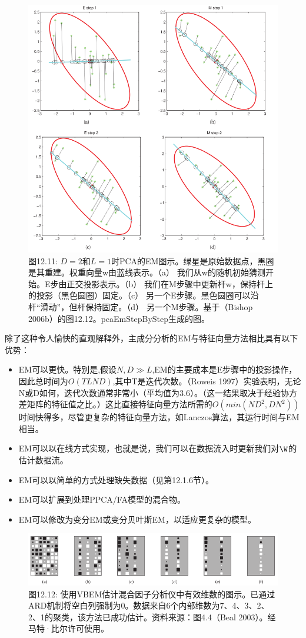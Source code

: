 \documentclass[a4paper]{article}
\begin{document}
\begin{figure}[h]
	\centering
	\includegraphics[width=0.7\linewidth]{fig/figure11}
	\caption*{图12.11: $D=2$和$L=1$时PCA的EM图示。绿星是原始数据点，黑圈是其重建。权重向量w由蓝线表示。（a） 我们从w的随机初始猜测开始。E步由正交投影表示。（b） 我们在M步骤中更新杆w，保持杆上的投影（黑色圆圈）固定。（c） 另一个E步骤。黑色圆圈可以沿杆“滑动”，但杆保持固定。（d） 另一个M步骤。基于（Bishop 2006b）的图12.12。pcaEmStepByStep生成的图。 }
\end{figure}

除了这种令人愉快的直观解释外，主成分分析的EM与特征向量方法相比具有以下优势： 
\begin{itemize}
\item  EM可以更快。特别是,假设$N,D \gg L$,EM的主要成本是E步骤中的投影操作，因此总时间为$O(TLND)$,其中T是迭代次数。（Roweis 1997）实验表明，无论N或D如何，迭代次数通常非常小（平均值为3.6）。（这一结果取决于经验协方差矩阵的特征值之比。）这比直接特征向量方法所需的$O(min(ND^2,DN^2))$时间快得多，尽管更复杂的特征向量方法，如Lanczos算法，其运行时间与EM相当。
\item EM可以以在线方式实现，也就是说，我们可以在数据流入时更新我们对$\W$的估计数据流。 
\item EM可以以简单的方式处理缺失数据（见第12.1.6节）。 
\item EM可以扩展到处理PPCA/FA模型的混合物。 
\item EM可以修改为变分EM或变分贝叶斯EM，以适应更复杂的模型。 
\end{itemize}

\begin{figure}[h]
	\centering
	\includegraphics[width=0.7\linewidth]{fig/figure12}
	\caption*{图12.12: 使用VBEM估计混合因子分析仪中有效维数的图示。已通过ARD机制将空白列强制为0。数据来自6个内部维数为7、4、3、2、2、1的聚类，该方法已成功估计。资料来源：图4.4（Beal 2003）。经马特·比尔许可使用。 }
\end{figure}
\end{document}
